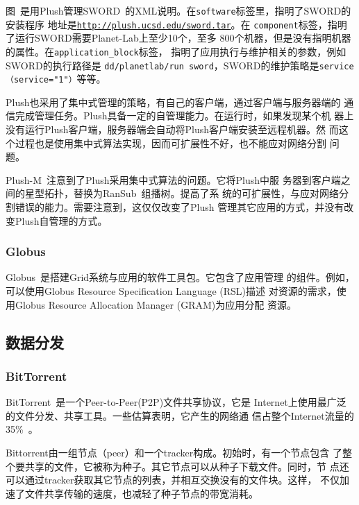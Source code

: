 图~\cite{fig:plush_spec}是用Plush管理SWORD~\cite{sword_worlds,
sword_toit}的XML说明。在\texttt{software}标签里，指明了SWORD的安装程序
地址是\texttt{\url{http://plush.ucsd.edu/sword.tar}}。在
\texttt{component}标签，指明了运行SWORD需要Planet-Lab上至少10个，至多
800个机器，但是没有指明机器的属性。在\texttt{application\_block}标签，
指明了应用执行与维护相关的参数，例如SWORD的执行路径是
\texttt{dd\-/planetlab\-/run sword}，SWORD的维护策略是\texttt{service
（service="1"）}等等。

Plush也采用了集中式管理的策略，有自己的客户端，通过客户端与服务器端的
通信完成管理任务。Plush具备一定的自管理能力。在运行时，如果发现某个机
器上没有运行Plush客户端，服务器端会自动将Plush客户端安装至远程机器。然
而这个过程也是使用集中式算法实现，因而可扩展性不好，也不能应对网络分割
问题。

Plush-M~\cite{plush-m}注意到了Plush采用集中式算法的问题。它将Plush中服
务器到客户端之间的星型拓扑，替换为RanSub~\cite{ransub}组播树。提高了系
统的可扩展性，与应对网络分割错误的能力。需要注意到，这仅仅改变了Plush
管理其它应用的方式，并没有改变Plush自管理的方式。

\subsubsection*{Globus}

Globus~\cite{globus}是搭建Grid系统与应用的软件工具包。它包含了应用管理
的组件。例如，可以使用Globus Resource Specification Language (RSL)描述
对资源的需求，使用Globus Resource Allocation Manager (GRAM)为应用分配
资源。




\subsection{数据分发}

\subsubsection*{BitTorrent}

BitTorrent~\cite{bittorrent}是一个Peer-to-Peer(P2P)文件共享协议，它是
Internet上使用最广泛的文件分发、共享工具。一些估算表明，它产生的网络通
信占整个Internet流量的35\%~\cite{bt2004}。

Bittorrent由一组节点（peer）和一个tracker构成。初始时，有一个节点包含
了整个要共享的文件，它被称为种子。其它节点可以从种子下载文件。同时，节
点还可以通过tracker获取其它节点的列表，并相互交换没有的文件块。这样，
不仅加速了文件共享传输的速度，也减轻了种子节点的带宽消耗。


